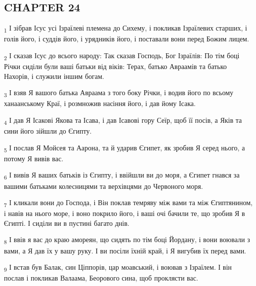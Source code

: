 \subsection{CHAPTER 24}
\begin{tcolorbox}
\textsubscript{1} І зібрав Ісус усі Ізраїлеві племена до Сихему, і покликав Ізраїлевих старших, і голів його, і суддів його, і урядників його, і поставали вони перед Божим лицем.
\end{tcolorbox}
\begin{tcolorbox}
\textsubscript{2} І сказав Ісус до всього народу: Так сказав Господь, Бог Ізраїлів: По тім боці Річки сиділи були ваші батьки від віків: Терах, батько Авраамів та батько Нахорів, і служили іншим богам.
\end{tcolorbox}
\begin{tcolorbox}
\textsubscript{3} І взяв Я вашого батька Авраама з того боку Річки, і водив його по всьому ханаанському Краї, і розмножив насіння його, і дав йому Ісака.
\end{tcolorbox}
\begin{tcolorbox}
\textsubscript{4} І дав Я Ісакові Якова та Ісава, і дав Ісавові гору Сеїр, щоб її посів, а Яків та сини його зійшли до Єгипту.
\end{tcolorbox}
\begin{tcolorbox}
\textsubscript{5} І послав Я Мойсея та Аарона, та й ударив Єгипет, як зробив Я серед нього, а потому Я вивів вас.
\end{tcolorbox}
\begin{tcolorbox}
\textsubscript{6} І вивів Я ваших батьків із Єгипту, і ввійшли ви до моря, а Єгипет гнався за вашими батьками колесницями та верхівцями до Червоного моря.
\end{tcolorbox}
\begin{tcolorbox}
\textsubscript{7} І кликали вони до Господа, і Він поклав темряву між вами та між Єгиптянином, і навів на нього море, і воно покрило його, і ваші очі бачили те, що зробив Я в Єгипті. І сиділи ви в пустині багато днів.
\end{tcolorbox}
\begin{tcolorbox}
\textsubscript{8} І ввів я вас до краю амореян, що сидять по тім боці Йордану, і вони воювали з вами, а Я дав їх у вашу руку. І ви посіли їхній край, і Я вигубив їх перед вами.
\end{tcolorbox}
\begin{tcolorbox}
\textsubscript{9} І встав був Балак, син Ціппорів, цар моавський, і воював з Ізраїлем. І він послав і покликав Валаама, Беорового сина, щоб проклясти вас.
\end{tcolorbox}

